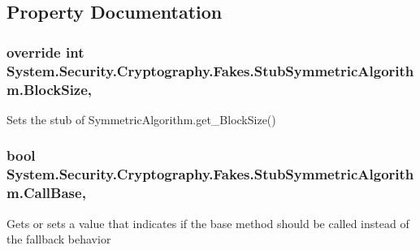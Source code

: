 \subsection{Property Documentation}
\hypertarget{class_system_1_1_security_1_1_cryptography_1_1_fakes_1_1_stub_symmetric_algorithm_aa3626e199cbe22b8e1343775a52f3aa0}{
\subsubsection[{Block\-Size}]{\setlength{\rightskip}{0pt plus 5cm}override int System.\-Security.\-Cryptography.\-Fakes.\-Stub\-Symmetric\-Algorithm.\-Block\-Size\hspace{0.3cm}{\ttfamily [get]}, {\ttfamily [set]}}}\label{class_system_1_1_security_1_1_cryptography_1_1_fakes_1_1_stub_symmetric_algorithm_aa3626e199cbe22b8e1343775a52f3aa0}


Sets the stub of Symmetric\-Algorithm.\-get\-\_\-\-Block\-Size()

\hypertarget{class_system_1_1_security_1_1_cryptography_1_1_fakes_1_1_stub_symmetric_algorithm_aa1d4afa99f5507bceb6adcef0f734af7}{
\subsubsection[{Call\-Base}]{\setlength{\rightskip}{0pt plus 5cm}bool System.\-Security.\-Cryptography.\-Fakes.\-Stub\-Symmetric\-Algorithm.\-Call\-Base\hspace{0.3cm}{\ttfamily [get]}, {\ttfamily [set]}}}\label{class_system_1_1_security_1_1_cryptography_1_1_fakes_1_1_stub_symmetric_algorithm_aa1d4afa99f5507bceb6adcef0f734af7}


Gets or sets a value that indicates if the base method should be called instead of the fallback behavior


